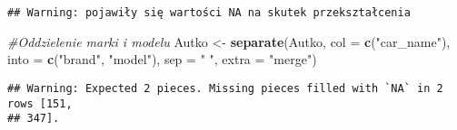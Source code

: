 \documentclass[
]{article}
\newenvironment{Shaded}{\begin{snugshade}}{\end{snugshade}}
\newcommand{\CommentTok}[1]{\textcolor[rgb]{0.56,0.35,0.01}{\textit{#1}}}
\newcommand{\DataTypeTok}[1]{\textcolor[rgb]{0.13,0.29,0.53}{#1}}
\newcommand{\KeywordTok}[1]{\textcolor[rgb]{0.13,0.29,0.53}{\textbf{#1}}}
\newcommand{\NormalTok}[1]{#1}
\newcommand{\StringTok}[1]{\textcolor[rgb]{0.31,0.60,0.02}{#1}}
\begin{document}
\begin{verbatim}
## Warning: pojawiły się wartości NA na skutek przekształcenia
\end{verbatim}

\begin{Shaded}
\begin{Highlighting}[]
\CommentTok{#Oddzielenie marki i modelu }
\NormalTok{Autko <-}\StringTok{ }\KeywordTok{separate}\NormalTok{(Autko, }\DataTypeTok{col =} \KeywordTok{c}\NormalTok{(}\StringTok{"car_name"}\NormalTok{), }\DataTypeTok{into =} \KeywordTok{c}\NormalTok{(}\StringTok{"brand"}\NormalTok{, }\StringTok{"model"}\NormalTok{), }\DataTypeTok{sep =} \StringTok{" "}\NormalTok{, }\DataTypeTok{extra =} \StringTok{"merge"}\NormalTok{)}
\end{Highlighting}
\end{Shaded}

\begin{verbatim}
## Warning: Expected 2 pieces. Missing pieces filled with `NA` in 2 rows [151,
## 347].
\end{verbatim}
\end{document}
